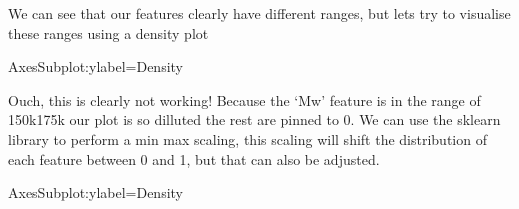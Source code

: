 \documentclass[letterpaper,10pt,english]{jupyterBook}
\begin{document}
\sphinxAtStartPar
We can see that our features clearly have different ranges, but lets try to visualise these ranges using a density plot

\begin{sphinxVerbatim}[commandchars=\\\{\}]
\end{sphinxVerbatim}

\begin{sphinxVerbatim}[commandchars=\\\{\}]
\PYGZlt{}AxesSubplot:ylabel=\PYGZsq{}Density\PYGZsq{}\PYGZgt{}
\end{sphinxVerbatim}

\noindent{}

\sphinxAtStartPar
Ouch, this is clearly not working! Because the ‘Mw’ feature is in the range of 150k\sphinxhyphen{}175k our plot is so dilluted the rest are pinned to 0.
We can use the sklearn library to perform a min max scaling, this scaling will shift the distribution of each feature between 0 and 1, but that can also be adjusted.

\begin{sphinxVerbatim}[commandchars=\\\{\}]
   
\end{sphinxVerbatim}

\begin{sphinxVerbatim}[commandchars=\\\{\}]
  
 
\end{sphinxVerbatim}

\begin{sphinxVerbatim}[commandchars=\\\{\}]
\PYGZlt{}AxesSubplot:ylabel=\PYGZsq{}Density\PYGZsq{}\PYGZgt{}
\end{sphinxVerbatim}
\end{document}
